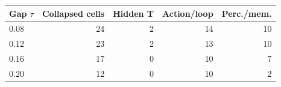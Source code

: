 \begin{tabular}{lrrrr}
\toprule
Gap $\tau$ & Collapsed cells & Hidden T & Action/loop & Perc./mem. \\
\midrule
0.08 & 24 & 2 & 14 & 10 \\
0.12 & 23 & 2 & 13 & 10 \\
0.16 & 17 & 0 & 10 & 7 \\
0.20 & 12 & 0 & 10 & 2 \\
\bottomrule
\end{tabular}

